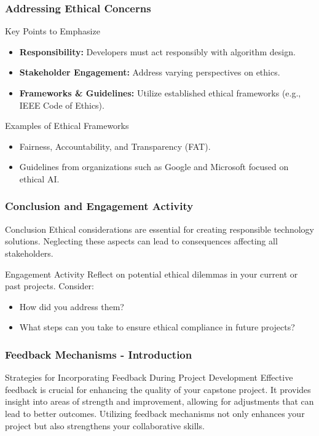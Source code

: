 \documentclass[aspectratio=169]{beamer}
\begin{document}
\begin{frame}[fragile]
    \frametitle{Addressing Ethical Concerns}
    \begin{block}{Key Points to Emphasize}
        \begin{itemize}
            \item \textbf{Responsibility:} Developers must act responsibly with algorithm design.
            \item \textbf{Stakeholder Engagement:} Address varying perspectives on ethics.
            \item \textbf{Frameworks \& Guidelines:} Utilize established ethical frameworks (e.g., IEEE Code of Ethics).
        \end{itemize}
    \end{block}
    \begin{block}{Examples of Ethical Frameworks}
        \begin{itemize}
            \item Fairness, Accountability, and Transparency (FAT).
            \item Guidelines from organizations such as Google and Microsoft focused on ethical AI.
        \end{itemize}
    \end{block}
\end{frame}

\begin{frame}[fragile]
    \frametitle{Conclusion and Engagement Activity}
    \begin{block}{Conclusion}
        Ethical considerations are essential for creating responsible technology solutions. Neglecting these aspects can lead to consequences affecting all stakeholders.
    \end{block}
    \begin{block}{Engagement Activity}
        Reflect on potential ethical dilemmas in your current or past projects. Consider:
        \begin{itemize}
            \item How did you address them?
            \item What steps can you take to ensure ethical compliance in future projects?
        \end{itemize}
    \end{block}
\end{frame}

\begin{frame}[fragile]
    \frametitle{Feedback Mechanisms - Introduction}
    \begin{block}{Strategies for Incorporating Feedback During Project Development}
        Effective feedback is crucial for enhancing the quality of your capstone project. It provides insight into areas of strength and improvement, allowing for adjustments that can lead to better outcomes. Utilizing feedback mechanisms not only enhances your project but also strengthens your collaborative skills.
    \end{block}
\end{frame}
\end{document}
